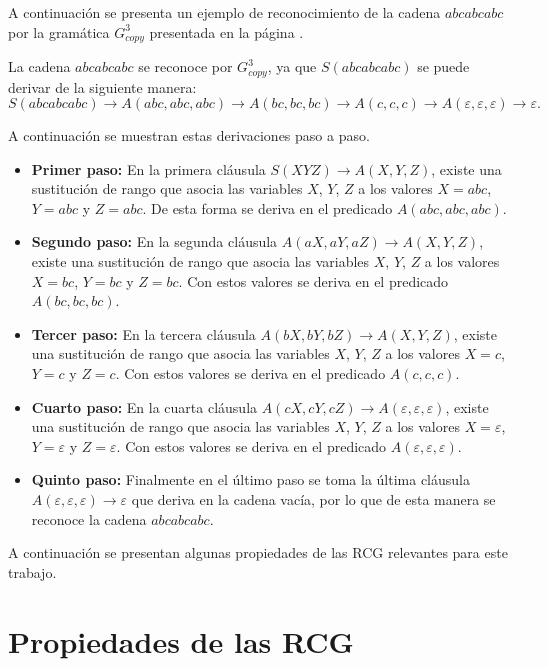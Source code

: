 A continuación se presenta un ejemplo de reconocimiento de la cadena $abcabcabc$ por la gramática $G^3_{copy}$
presentada en la página \pageref{g_3copy}.

La cadena $abcabcabc$ se reconoce por $G^3_{copy}$, ya que $S(abcabcabc)$ se puede derivar de la siguiente manera:
$$S(abcabcabc)\to A(abc,abc,abc)\to A(bc,bc,bc)\to A(c,c,c)\to A(\varepsilon,\varepsilon,\varepsilon)\to \varepsilon.$$

A continuación se muestran estas derivaciones paso a paso.

\begin{itemize}
    \item \textbf{Primer paso:} En la primera cláusula $S(XYZ)\to A(X,Y,Z)$, existe una sustitución de rango que asocia las variables $X$, $Y$, $Z$ a los valores $X=abc$, $Y=abc$ y $Z=abc$. De esta forma se deriva en el predicado $A(abc,abc,abc)$.
    \item \textbf{Segundo paso:} En la segunda cláusula $A(aX,aY,aZ)\to A(X,Y,Z)$, existe una sustitución de rango que asocia las
          variables $X$, $Y$, $Z$ a los valores $X=bc$, $Y=bc$ y $Z=bc$. Con estos valores se deriva en el predicado $A(bc,bc,bc)$.
    \item \textbf{Tercer paso:} En la tercera cláusula $A(bX,bY,bZ)\to A(X,Y,Z)$, existe una sustitución de rango que asocia las
          variables $X$, $Y$, $Z$ a los valores $X=c$, $Y=c$ y $Z=c$. Con estos valores se deriva en el predicado $A(c,c,c)$.
    \item \textbf{Cuarto paso:} En la cuarta cláusula $A(cX,cY,cZ)\to A(\varepsilon,\varepsilon,\varepsilon)$, existe una sustitución de rango que asocia las variables $X$, $Y$, $Z$ a los valores $X=\varepsilon$, $Y=\varepsilon$ y $Z=\varepsilon$. Con estos valores se deriva en el predicado $A(\varepsilon,\varepsilon,\varepsilon)$.
    \item \textbf{Quinto paso:} Finalmente en el último paso se toma la última cláusula $A(\varepsilon,\varepsilon,\varepsilon)\to \varepsilon$ que deriva en la cadena vacía, por lo que de esta manera se reconoce la cadena $abcabcabc$.
\end{itemize}


A continuación se presentan algunas propiedades de las RCG relevantes para este trabajo.

\section{Propiedades de las RCG}

